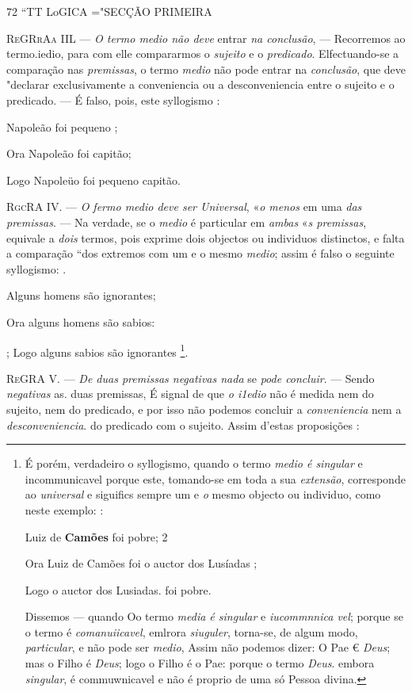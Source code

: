 72 “TT LoGICA ="SECÇÃO PRIMEIRA

\textsc{ReGRrAa} IIL --- \emph{O termo medio não deve} entrar \emph{na conclusão}, --- Recorremos ao termo.iedio, para com elle compararmos o \emph{sujeito} e o \emph{predicado}. Elfectuando-se a comparação nas \emph{premissas}, o termo \emph{medio} não pode entrar na \emph{conclusão}, que deve "declarar exclusivamente a conveniencia ou a desconveniencia entre o sujeito e o predicado. --- É falso, pois, este syllogismo :

Napoleão foi pequeno ;

Ora Napoleão foi capitão;

Logo Napoleüo foi pequeno capitão.

\textsc{RgcRA} IV. --- \emph{O fermo medio deve ser Universal}, «\emph{o menos} em uma \emph{das premissas}. --- Na verdade, se o \emph{medio} é particular em \emph{ambas} «\emph{s premissas}, equivale a \emph{dois} termos, pois exprime dois objectos ou individuos distinctos, e falta a comparação “dos extremos com um e o mesmo \emph{medio}; assim é falso o seguinte syllogismo: .

Alguns homens são ignorantes;

Ora alguns homens são sabios:

; Logo alguns sabios são ignorantes \footnote{É porém, verdadeiro o syllogismo, quando o termo \emph{medio é singular} e incommunicavel porque este, tomando-se em toda a sua \emph{extensão}, corresponde ao \emph{universal} e siguifics sempre um e \emph{o} mesmo objecto ou individuo, como neste exemplo: :\par Luiz de \textbf{Camões} foi pobre; 2\par Ora Luiz de Camões foi o auctor dos Lusíadas ;\par Logo o auctor dos Lusiadas. foi pobre.\par Dissemos --- quando Oo termo \emph{media é singular} e \emph{iucommnnica vel}; porque se o termo é \emph{comanuiicavel}, emlrora \emph{siuguler}, torna-se, de algum modo, \emph{particular}, e não pode ser \emph{medio}, Assim não podemos dizer: O Pae € \emph{Deus}; mas o Filho é \emph{Deus}; logo o Filho é o Pae: porque o termo \emph{Deus}. embora \emph{singular}, é commuwnicavel e não é proprio de uma só Pessoa divina.}.

\textsc{ReGRA} V. --- \emph{De duas premissas negativas nada} se \emph{pode concluir}. --- Sendo \emph{negativas} as. duas premissas, É signal de que \emph{o i1edio} não é medida nem do sujeito, nem do predicado, e por isso não podemos concluir a \emph{conveniencia} nem a \emph{desconveniencia}. do predicado com o sujeito. Assim d'estas proposições :

